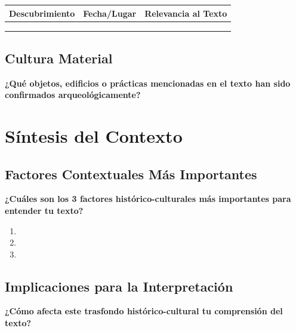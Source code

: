 \documentclass[11pt,a4paper]{article}
\begin{document}
\begin{tabularx}{\textwidth}{|X|X|X|}
\hline
\textbf{Descubrimiento} & \textbf{Fecha/Lugar} & \textbf{Relevancia al Texto} \\
\hline
& & \\[1.5cm]
\hline
& & \\[1.5cm]
\hline
& & \\[1.5cm]
\hline
\end{tabularx}

\subsection{Cultura Material}

\textbf{¿Qué objetos, edificios o prácticas mencionadas en el texto han sido confirmados arqueológicamente?}
\vspace{3cm}

\section{Síntesis del Contexto}

\subsection{Factores Contextuales Más Importantes}

\textbf{¿Cuáles son los 3 factores histórico-culturales más importantes para entender tu texto?}

\begin{enumerate}[leftmargin=1cm]
    \item \hspace{12cm}
    \vspace{1cm}
    \item \hspace{12cm}
    \vspace{1cm}
    \item \hspace{12cm}
    \vspace{1cm}
\end{enumerate}

\subsection{Implicaciones para la Interpretación}

\textbf{¿Cómo afecta este trasfondo histórico-cultural tu comprensión del texto?}
\vspace{3cm}
\end{document}
